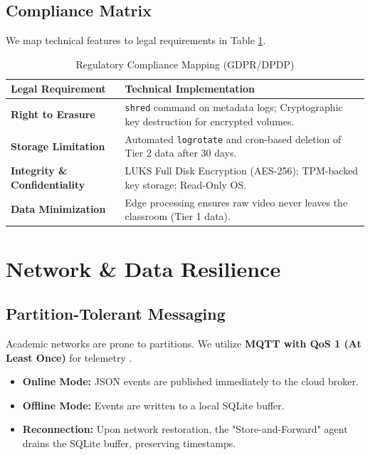 \documentclass[conference]{IEEEtran}
\begin{document}
\subsection{Compliance Matrix}
We map technical features to legal requirements in Table \ref{tab:compliance}.

\begin{table}[h]
\caption{Regulatory Compliance Mapping (GDPR/DPDP)}
\begin{center}
\begin{tabular}{|p{3cm}|p{4.5cm}|}
\hline
\textbf{Legal Requirement} & \textbf{Technical Implementation} \\
\hline
\textbf{Right to Erasure} & \texttt{shred} command on metadata logs; Cryptographic key destruction for encrypted volumes. \\
\hline
\textbf{Storage Limitation} & Automated \texttt{logrotate} and cron-based deletion of Tier 2 data after 30 days. \\
\hline
\textbf{Integrity \& Confidentiality} & LUKS Full Disk Encryption (AES-256); TPM-backed key storage; Read-Only OS. \\
\hline
\textbf{Data Minimization} & Edge processing ensures raw video never leaves the classroom (Tier 1 data). \\
\hline
\end{tabular}
\end{center}
\label{tab:compliance}
\end{table}

\section{Network \& Data Resilience}

\subsection{Partition-Tolerant Messaging}
Academic networks are prone to partitions. We utilize \textbf{MQTT with QoS 1 (At Least Once)} for telemetry \cite{b16}.
\begin{itemize}
    \item \textbf{Online Mode:} JSON events are published immediately to the cloud broker.
    \item \textbf{Offline Mode:} Events are written to a local SQLite buffer.
    \item \textbf{Reconnection:} Upon network restoration, the "Store-and-Forward" agent drains the SQLite buffer, preserving timestamps.
\end{itemize}
\end{document}
